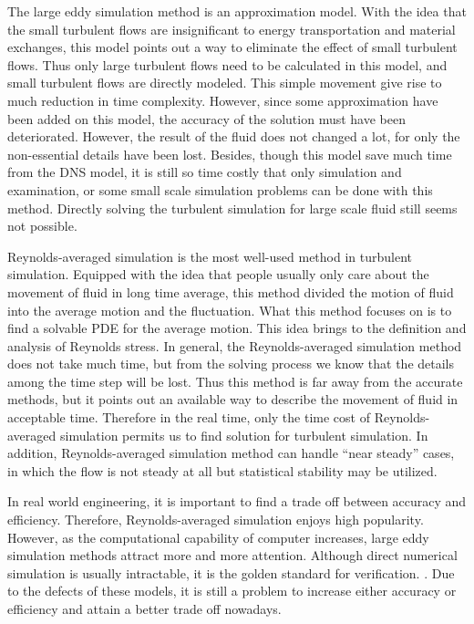 \documentclass[english, nochinese]{pkupaper}
\begin{document}
The large eddy simulation method is an approximation model. With the idea that the small turbulent flows are insignificant to energy transportation and material exchanges, this model points out a way to eliminate the effect of small turbulent flows. Thus only large turbulent flows need to be calculated in this model, and small turbulent flows are directly modeled. This simple movement give rise to much reduction in time complexity. However, since some approximation have been added on this model, the accuracy of the solution must have been deteriorated. However, the result of the fluid does not changed a lot, for only the non-essential details have been lost. Besides, though this model save much time from the DNS model, it is still so time costly that only simulation and examination, or some small scale simulation problems can be done with this method. Directly solving the turbulent simulation for large scale fluid still seems not possible.

Reynolds-averaged simulation is the most well-used method in turbulent simulation. Equipped with the idea that people usually only care about the movement of fluid in long time average, this method divided the motion of fluid into the average motion and the fluctuation. What this method focuses on is to find a solvable PDE for the average motion. This idea brings to the definition and analysis of Reynolds stress. In general, the Reynolds-averaged simulation method does not take much time, but from the solving process we know that the details among the time step will be lost. Thus this method is far away from the accurate methods, but it points out an available way to describe the movement of fluid in acceptable time. Therefore in the real time, only the time cost of Reynolds-averaged simulation permits us to find solution for turbulent simulation. In addition, Reynolds-averaged simulation method can handle ``near steady'' cases, in which the flow is not steady at all but statistical stability may be utilized.

In real world engineering, it is important to find a trade off between accuracy and efficiency. Therefore, Reynolds-averaged simulation enjoys high popularity. However, as the computational capability of computer increases, large eddy simulation methods attract more and more attention. Although direct numerical simulation is usually intractable, it is the golden standard for verification. \parencite{zhaoshun_zhang_theory_2005}. Due to the defects of these models, it is still a problem to increase either accuracy or efficiency and attain a better trade off nowadays.
\end{document}
